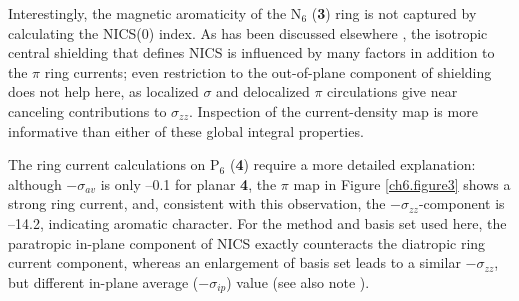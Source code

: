 Interestingly, the magnetic aromaticity of the N$_6$ (\textbf{3}) ring is not captured by
calculating the NICS(0) index. As has been discussed elsewhere \cite{steiner1},
the isotropic central shielding that defines NICS is influenced by many factors in addition to
the $\pi$ ring currents; even restriction to the out-of-plane component of
shielding does not help here, as localized $\sigma$ and delocalized $\pi$ circulations give near canceling
contributions to $\sigma_{zz}$. Inspection
of the current-density map is more informative than either of these global
integral properties.

The ring current calculations on P$_6$ (\textbf{4}) require a more detailed explanation:
although $-\sigma_{av}$ is only --0.1 for planar \textbf{4}, the $\pi$ map
in Figure \ref{ch6.figure3} shows a strong ring current, and, consistent with this observation, the
$-\sigma_{zz}$-component is --14.2, indicating aromatic character. For the method and basis set
used here, the paratropic in-plane component of NICS exactly counteracts the diatropic
ring current component, whereas an enlargement of basis set leads to a similar $-\sigma_{zz}$,
but different in-plane average ($-\sigma_{ip}$) value (see also note  \cite{footnote}).

